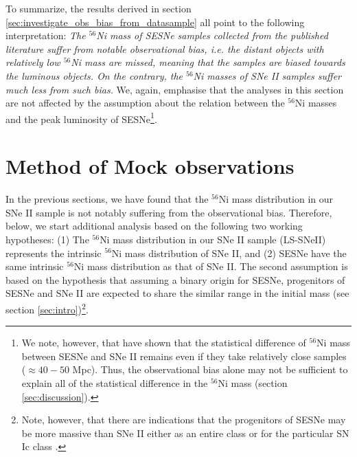\documentclass[twocolumn, linenumbers]{aastex62}
\begin{document}

To summarize, the results derived in section \ref{sec:investigate_obs_bias_from_datasample} 
all point to the following interpretation: {\it The $^{56}$Ni mass of SESNe samples collected from the published literature suffer from notable observational bias, i.e. the distant objects with relatively low $^{56}$Ni mass are missed, meaning that the samples are biased towards the luminous objects. On the contrary, the $^{56}$Ni masses of SNe II samples suffer much less from such bias.} We, again, emphasise that the analyses in this section are not affected by the assumption about the relation between the $^{56}$Ni masses and the peak luminosity of SESNe\footnote{We note, however, that \citet{2020A&A...641A.177M} have shown that the statistical difference of $^{56}$Ni mass between SESNe and SNe II remains even if they take relatively close samples ($\approx 40-50$ Mpc). Thus, the observational bias alone may not be sufficient to explain all of the statistical difference in the $^{56}$Ni mass (section \ref{sec:discussion}).}.

\section{Method of Mock observations} \label{sec:mock_obs}

In the previous sections, we have found that the $^{56}$Ni mass distribution in our SNe II sample is not notably suffering from the observational bias. Therefore, below, we start additional analysis based on the following two working hypotheses: (1) The $^{56}$Ni mass distribution in our SNe II sample (LS-SNeII) represents the intrinsic $^{56}$Ni mass distribution of SNe II, and (2) SESNe have the same intrinsic $^{56}$Ni mass distribution as that of SNe II. The second assumption is based on the hypothesis that
assuming a binary origin for SESNe, progenitors of SESNe and SNe II are expected to share the similar range in the initial mass (see section \ref{sec:intro})\footnote{Note, however, that there are indications that the progenitors of SESNe may be more massive than SNe II either as an entire class or for the particular SN Ic class \citep[e.g.][]{2012MNRAS.424.1372A, 2012ApJ...749L..28V, 2019NatAs...3..434F}.}.
\end{document}
